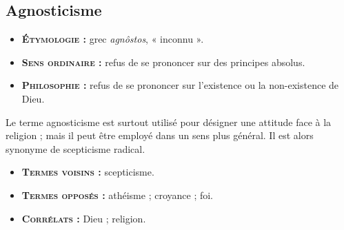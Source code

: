 


\subsection{Agnosticisme}

{\footnotesize
\begin{itemize}[leftmargin=1cm, label=, itemsep=1pt]
\item {\bf \textsc{Étymologie} :} grec {\it agnôstos},
« inconnu ».
\item {\bf \textsc{Sens ordinaire} :} refus de se
prononcer sur des principes absolus.
\item {\bf \textsc{Philosophie} :} refus de se
prononcer sur l’existence ou la non-existence de Dieu.
\end{itemize}
}

Le terme agnosticisme est surtout utilisé
pour désigner une attitude face à la religion ;
mais il peut être employé dans un
sens plus général. Il est alors synonyme
de scepticisme radical.

{\footnotesize
\begin{itemize}[leftmargin=1cm, label=, itemsep=1pt]
\item {\bf \textsc{Termes voisins} :} scepticisme.
\item {\bf \textsc{Termes opposés} :} athéisme ;
croyance ; foi.
\item {\bf \textsc{Corrélats} :} Dieu ;
religion.
\end{itemize}
}

